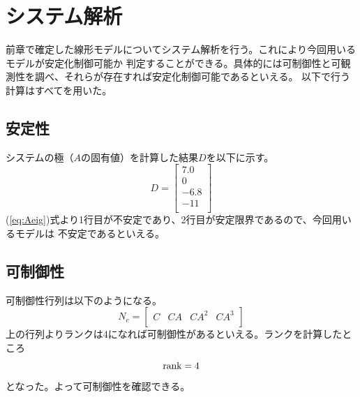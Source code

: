 \section{システム解析}
	前章で確定した線形モデルについてシステム解析を行う。これにより今回用いるモデルが安定化制御可能か
	判定することができる。具体的には可制御性と可観測性を調べ、それらが存在すれば安定化制御可能であるといえる。
	以下で行う計算はすべて\MaTX{}を用いた。
	\subsection{安定性}
		システムの極（$A$の固有値）を計算した結果$D$を以下に示す。
		\begin{equation}
			D=\left[
			\begin{array}{c}
				7.0\\
				0\\
				-6.8\\
				-11\\
			\end{array}
			\right]
			\label{eq:Aeig}
		\end{equation}
		(\ref{eq:Aeig})式より1行目が不安定であり、2行目が安定限界であるので、今回用いるモデルは
		不安定であるといえる。
	\subsection{可制御性}
		可制御性行列は以下のようになる。
		\begin{equation}
			N_{c} = \left[
			\begin{array}{cccc}
				C & CA & CA^{2} & CA^{3} \\
			\end{array}
			\right]
		\end{equation}
		上の行列よりランクは4になれば可制御性があるといえる。ランクを計算したところ
		\begin{equation}
			\rm{rank}  = 4
		\end{equation}
		となった。よって可制御性を確認できる。\\

